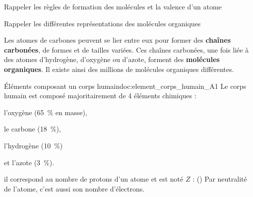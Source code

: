 \teteTermStssOrga

\vspace*{-30pt}

\begin{objectifs}
  \item Rappeler les règles de formation des molécules et la valence d'un atome
  \item Rappeler les différentes représentations des molécules organiques
\end{objectifs}

\begin{contexte}
  Les atomes de carbones peuvent se lier entre eux pour former des \textbf{chaînes carbonées}, de formes et de tailles variées.
  Ces chaînes carbonées, une fois liée à des atomes d'hydrogène, d'oxygène ou d'azote, forment des \textbf{molécules organiques}.
  Il existe ainsi des millions de molécules organiques différentes.

\end{contexte}


\vspace*{-8pt}
\vspace*{-8pt}

\begin{doc}{Éléments composant un corps humain}{doc:element_corps_humain_A1}
  Le corps humain est composé majoritairement de 4 éléments chimiques :
  \vspace*{-4pt}
  \begin{multicols}{2}
  \begin{listePoints}
    \item l'oxygène   \oxygene (\qty{65}{\percent} en masse),
    \item le carbone  \carbone (\qty{18}{\percent}),
    \item l'hydrogène \hydrogene (\qty{10}{\percent})
    \item et l'azote   (\qty{3}{\percent}).
  \end{listePoints}
  \end{multicols}
  
  \begin{importants}
     il correspond au nombre de protons d'un atome et est noté $Z$ :  (\hspace{-8pt}\exemple {})
    Par neutralité de l'atome, c'est aussi son nombre d'électrons.
  \end{importants}
\end{doc}

